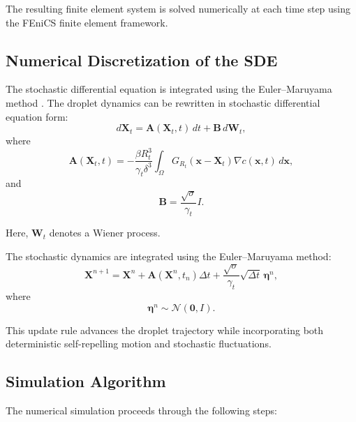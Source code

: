 The resulting finite element system is solved numerically at each time step using the FEniCS finite element framework\cite{fenics2016}.

\subsection{Numerical Discretization of the SDE}
The stochastic differential equation is integrated using the Euler--Maruyama method
\cite{balakrishnan2021,SDE_EulerMaruyama}.
The droplet dynamics can be rewritten in stochastic differential equation form:
\begin{equation}
d\mathbf{X}_t
=
\mathbf{A}(\mathbf{X}_t,t)\,dt
+
\mathbf{B}\,d\mathbf{W}_t,
\end{equation}
where
\begin{equation}
\mathbf{A}(\mathbf{X}_t,t)
=
-\frac{\beta R_t^3}{\gamma_t\delta^3}
\int_{\Omega}
G_{R_t}(\mathbf{x}-\mathbf{X}_t)
\nabla c(\mathbf{x},t)\,d\mathbf{x},
\end{equation}
and
\begin{equation}
\mathbf{B}
=
\frac{\sqrt{\sigma}}{\gamma_t}I.
\end{equation}

Here, \(\mathbf{W}_t\) denotes a Wiener process.

The stochastic dynamics are integrated using the Euler--Maruyama method:
\begin{equation}
\mathbf{X}^{n+1}
=
\mathbf{X}^{n}
+
\mathbf{A}(\mathbf{X}^{n},t_n)\Delta t
+
\frac{\sqrt{\sigma}}{\gamma_t}
\sqrt{\Delta t}\,
\boldsymbol{\eta}^{n},
\end{equation}
where
\begin{equation}
\boldsymbol{\eta}^{n}
\sim
\mathcal{N}(\mathbf{0},I).
\end{equation}

This update rule advances the droplet trajectory while incorporating both deterministic self-repelling motion and stochastic fluctuations.

\subsection{Simulation Algorithm}

The numerical simulation proceeds through the following steps:

